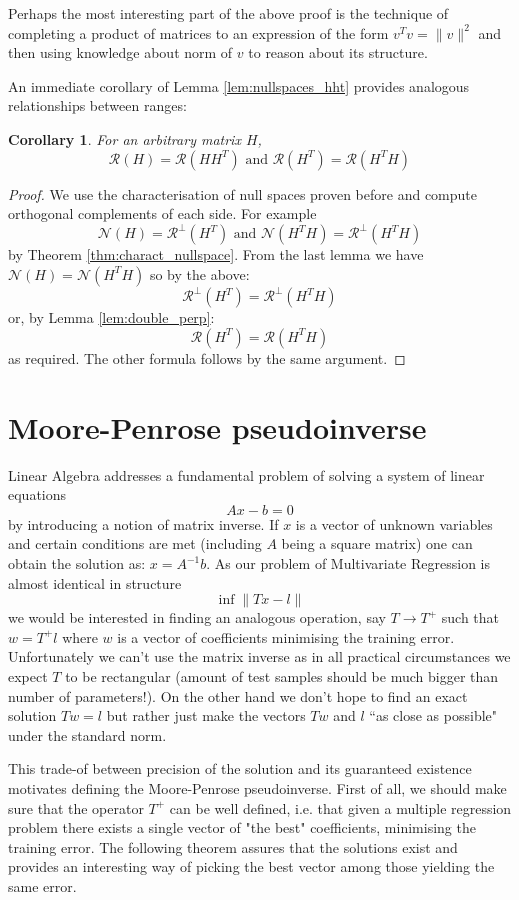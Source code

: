 \documentclass[a4paper]{article}
\theoremstyle{break}
\newtheorem{corollary}{Corollary}[theorem]
\newcommand{\Nu}{\mathcal{N}}
\newcommand{\Ra}{\mathcal{R}}
\begin{document}
Perhaps the most interesting part of the above proof is the technique of completing a product of matrices to an expression of the form $v^T v = \| v \|^2 $ and then using knowledge about norm of $v$ to reason about its structure.

An immediate corollary of Lemma \ref{lem:nullspaces_hht} provides analogous relationships between ranges:

\begin{corollary}
    For an arbitrary matrix $H$,
    $$\Ra(H) = \Ra(H H^T) \text{ and } \Ra(H^T) = \Ra(H^T H)$$
\end{corollary}

\begin{proof}
    We use the characterisation of null spaces proven before and compute orthogonal complements of each side. For example
    $$ \Nu(H) = \Ra^\perp (H^T) \text{ and } \Nu(H^T H) = \Ra^\perp ( H^T H )$$
    by Theorem \ref{thm:charact_nullspace}. From the last lemma we have
    $ \Nu(H) = \Nu(H^T H) $ so by the above:
    $$ \Ra^\perp (H^T) = \Ra^\perp ( H^T H ) $$
    or, by Lemma \ref{lem:double_perp}:
    $$ \Ra (H^T) = \Ra( H^T H ) $$
    as required. The other formula follows by the same argument.
\end{proof}


\section{Moore-Penrose pseudoinverse}
Linear Algebra addresses a fundamental problem of solving a system of linear equations
$$ A x - b = 0$$
by introducing a notion of matrix inverse. If $x$ is a vector of unknown variables and certain conditions are met (including $A$ being a square matrix) one can obtain the solution as: $ x = A^{-1} b $. As our problem of Multivariate Regression is almost identical in structure
$$ \inf \| T x - l \| $$
we would be interested in finding an analogous operation, say $ T \to T^+$ such that $ w = T^+ l$ where $w$ is a vector of coefficients minimising the training error. Unfortunately we can't use the matrix inverse as in all practical circumstances we expect $T$ to be rectangular (amount of test samples should be much bigger than number of parameters!). On the other hand we don't hope to find an exact solution $ T w = l$ but rather just make the vectors $T w$ and $l$ ``as close as possible" under the standard norm.

This trade-of between precision of the solution and its guaranteed existence motivates defining the Moore-Penrose pseudoinverse.
First of all, we should make sure that the operator $T^+$ can be well defined, i.e. that given a multiple regression problem there exists a single vector of "the best" coefficients, minimising the training error. The following theorem assures that the solutions exist and provides an interesting way of picking the best vector among those yielding the same error.
\end{document}
